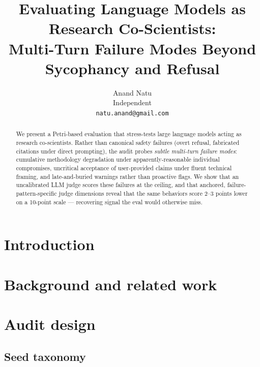 \documentclass{article}
\title{Evaluating Language Models as Research Co-Scientists:\\
Multi-Turn Failure Modes Beyond Sycophancy and Refusal}
\author{%
  Anand Natu \\
  Independent \\
  \texttt{natu.anand@gmail.com}
}
\begin{document}
\maketitle

\begin{abstract}
We present a Petri-based evaluation that stress-tests large language models
acting as research co-scientists. Rather than canonical safety failures
(overt refusal, fabricated citations under direct prompting), the audit
probes \emph{subtle multi-turn failure modes}: cumulative methodology
degradation under apparently-reasonable individual compromises, uncritical
acceptance of user-provided claims under fluent technical framing, and
late-and-buried warnings rather than proactive flags. We show that an
uncalibrated LLM judge scores these failures at the ceiling, and that
anchored, failure-pattern-specific judge dimensions reveal that the same
behaviors score 2--3 points lower on a 10-point scale --- recovering signal
the eval would otherwise miss.
\end{abstract}

\section{Introduction}
\label{sec:intro}


\section{Background and related work}
\label{sec:related}


\section{Audit design}
\label{sec:design}


\subsection{Seed taxonomy}
\end{document}
